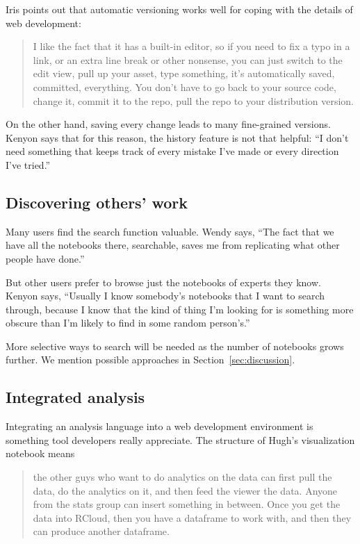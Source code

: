 
Iris points out that automatic versioning works well for coping with
the details of web development:
\begin{quote}
I like the fact that it has a built-in editor, so
if you need to fix a typo in a link, or an extra line break or other
nonsense, you can just switch to the edit view, pull up your asset, type
something, it's automatically saved, committed, everything. You don't have to go
back to your source code, change it, commit it to the repo, pull the repo to
your distribution version. 
\end{quote}

On the other hand, saving every change leads to many fine-grained
versions. Kenyon says that for this reason, the history feature is not that
helpful: ``I don't need something that keeps track of every mistake I've made or
every direction I've tried.''


\subsection{Discovering others' work}
Many users find the search function valuable. Wendy says, ``The fact that we have
all the notebooks there, searchable, saves me from replicating what other people
have done.''

But other users prefer to browse just the notebooks of experts they
know. Kenyon says, ``Usually I know somebody's notebooks that I want to search
through, because I know that the kind of thing I'm looking for is something
more obscure than I'm likely to find in some random person's.''

More selective ways to search will be needed as the number of notebooks
grows further. We mention possible approaches in Section~\ref{sec:discussion}.

\subsection{Integrated analysis}
Integrating an analysis language into a web development environment is something
tool developers really appreciate.  The structure of Hugh's visualization
notebook means
\begin{quote}
the other guys who want to do analytics on the data can first pull
the data, do the analytics on it, and then feed the viewer the data.
Anyone from the stats group can insert something in between.
Once you get the data into RCloud, then you have a dataframe
to work with, and then they can produce another dataframe.
\end{quote}

